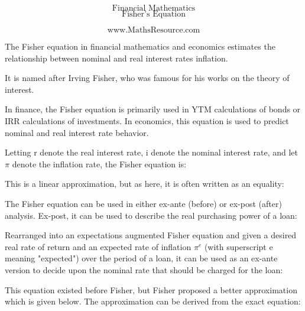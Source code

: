 \documentclass{beamer}
\begin{document}
	\begin{frame}
		\bigskip
		{
			\Huge
			\[ \mbox{Financial Mathematics}  \]
			\huge
			\[ \mbox{Fisher's Equation}  \]
		}
		
		{
			\LARGE
			\[ \mbox{www.MathsResource.com}  \]
		}
	\end{frame}



 
The Fisher equation in financial mathematics and economics estimates the relationship between nominal and real interest rates inflation. 

It is named after Irving Fisher, who was famous for his works on the theory of interest. 

In finance, the Fisher equation is primarily used in YTM calculations of bonds or IRR calculations of investments. In economics, this equation is used to predict nominal and real interest rate behavior.
 
Letting r denote the real interest rate, i denote the nominal interest rate, and let $\pi$ denote the inflation rate, the Fisher equation is:
 
This is a linear approximation, but as here, it is often written as an equality:


 
The Fisher equation can be used in either ex-ante (before) or ex-post (after) analysis. Ex-post, it can be used to describe the real purchasing power of a loan:
 
Rearranged into an expectations augmented Fisher equation and given a desired real rate of return and an expected rate of inflation $\pi^e$ (with superscript e meaning "expected") over the period of a loan, it can be used as an ex-ante version to decide upon the nominal rate that should be charged for the loan:
 
This equation existed before Fisher, but Fisher proposed a better approximation which is given below. The approximation can be derived from the exact equation:
 


\end{document}
